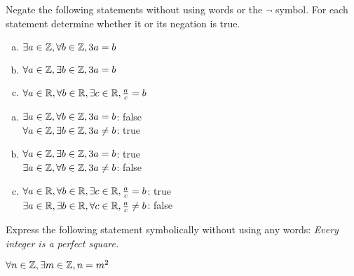 \begin{recommended}
  Negate the following statements without using words or the $\lnot$ symbol.
  For each statement determine whether it or its negation is true.
  \begin{enumerate}[(a)]
    \item $\exists a \in \mathbb{Z}, \forall b \in \mathbb{Z}, 3a=b$
    \item $\forall a \in \mathbb{Z}, \exists b \in \mathbb{Z}, 3a=b$
    \item $\forall a \in \mathbb{R}, \forall b \in \mathbb{R}, \exists c \in \mathbb{R}, \frac{a}{c}=b$
  \end{enumerate}
\end{recommended}
\begin{sol}
  \begin{enumerate}[(a)]
    \item $\exists a \in \mathbb{Z}, \forall b \in \mathbb{Z}, 3a=b$: false \\
          $\forall a \in \mathbb{Z}, \exists b \in \mathbb{Z}, 3a \neq b$: true
    \item $\forall a \in \mathbb{Z}, \exists b \in \mathbb{Z}, 3a=b$: true \\
          $\exists a \in \mathbb{Z}, \forall b \in \mathbb{Z}, 3a \neq b$: false
    \item $\forall a \in \mathbb{R}, \forall b \in \mathbb{R}, \exists c \in \mathbb{R}, \frac{a}{c}=b$: true \\
          $\exists a \in \mathbb{R}, \exists b \in \mathbb{R}, \forall c \in \mathbb{R}, \frac{a}{c} \neq b$: false
          \qedhere
  \end{enumerate}
\end{sol}

\begin{recommended}
  Express the following statement symbolically without using any words:
  \emph{Every integer is a perfect square.}
\end{recommended}
\begin{sol}
  $\forall n\in\mathbb{Z}, \exists m\in\mathbb{Z}, n = m^2$
\end{sol}

